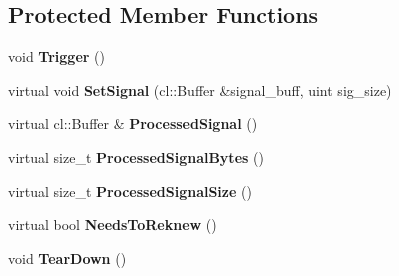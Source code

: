 \subsection*{Protected Member Functions}
\begin{DoxyCompactItemize}
\item 
void {\bfseries Trigger} ()\hypertarget{classjaspl_1_1ocl_1_1_f_f_t_a102a4328d7a30cc8ca8d08c907111fb2}{}\label{classjaspl_1_1ocl_1_1_f_f_t_a102a4328d7a30cc8ca8d08c907111fb2}

\item 
virtual void {\bfseries Set\+Signal} (cl\+::\+Buffer \&signal\+\_\+buff, uint sig\+\_\+size)\hypertarget{classjaspl_1_1ocl_1_1_f_f_t_ab38bdc5c38a82feaddb370f965295efd}{}\label{classjaspl_1_1ocl_1_1_f_f_t_ab38bdc5c38a82feaddb370f965295efd}

\item 
virtual cl\+::\+Buffer \& {\bfseries Processed\+Signal} ()\hypertarget{classjaspl_1_1ocl_1_1_f_f_t_aa03127efd639a389ec6869cc77fed978}{}\label{classjaspl_1_1ocl_1_1_f_f_t_aa03127efd639a389ec6869cc77fed978}

\item 
virtual size\+\_\+t {\bfseries Processed\+Signal\+Bytes} ()\hypertarget{classjaspl_1_1ocl_1_1_f_f_t_ad81ffbffde684b7d2cc68ee7b0c18e67}{}\label{classjaspl_1_1ocl_1_1_f_f_t_ad81ffbffde684b7d2cc68ee7b0c18e67}

\item 
virtual size\+\_\+t {\bfseries Processed\+Signal\+Size} ()\hypertarget{classjaspl_1_1ocl_1_1_f_f_t_a2243fd0a1e2496d51fc0b19f4b451c2d}{}\label{classjaspl_1_1ocl_1_1_f_f_t_a2243fd0a1e2496d51fc0b19f4b451c2d}

\item 
virtual bool {\bfseries Needs\+To\+Reknew} ()\hypertarget{classjaspl_1_1ocl_1_1_f_f_t_adea0ce7544d0049bfe5c39cc35cfa379}{}\label{classjaspl_1_1ocl_1_1_f_f_t_adea0ce7544d0049bfe5c39cc35cfa379}

\item 
void {\bfseries Tear\+Down} ()\hypertarget{classjaspl_1_1ocl_1_1_f_f_t_a6ad6e55ce5ca1ce4ecb280879994359a}{}\label{classjaspl_1_1ocl_1_1_f_f_t_a6ad6e55ce5ca1ce4ecb280879994359a}

\end{DoxyCompactItemize}
